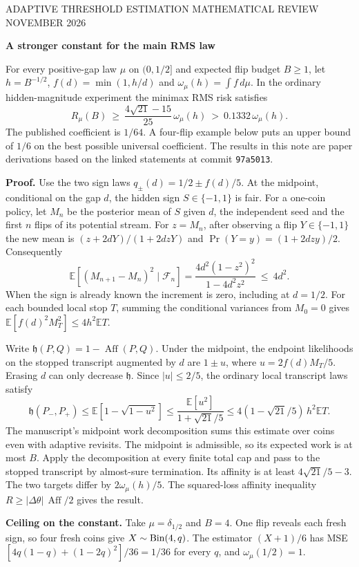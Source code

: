 \documentclass[11pt]{article}
\newcommand{\E}{\mathbb E}
\newcommand{\Aff}{\operatorname{Aff}}
\newcommand{\hd}{\mathfrak h}
\newcommand{\heading}[1]{{\LARGE\bfseries\color{ink} #1}\par\smallskip}
\begin{document}
{\small\color{ink} ADAPTIVE THRESHOLD ESTIMATION \hfill MATHEMATICAL REVIEW  NOVEMBER 2026}\par
\heading{A stronger constant for the main RMS law}
For every positive-gap law $\mu$ on $(0,1/2]$ and expected flip budget $B\ge1$, let
$h=B^{-1/2}$, $f(d)=\min(1,h/d)$ and $\omega_\mu(h)=\int f\,d\mu$.
In the ordinary hidden-magnitude experiment the minimax RMS risk satisfies
\[
   R_\mu(B)\ \ge\ \frac{4\sqrt{21}-15}{25}\,\omega_\mu(h)
          \ >\ 0.1332\,\omega_\mu(h).
\]
The published coefficient is $1/64$. A four-flip example below puts an upper bound of $1/6$ on the best possible universal coefficient. The results in this note are paper derivations based on the linked statements at commit \texttt{97a5013}.

\textbf{Proof.} Use the two sign laws $q_\pm(d)=1/2\pm f(d)/5$. At the midpoint, conditional on the gap $d$, the hidden sign $S\in\{-1,1\}$ is fair. For a one-coin policy, let $M_n$ be the posterior mean of $S$ given $d$, the independent seed and the first $n$ flips of its potential stream. For $z=M_n$, after observing a flip $Y\in\{-1,1\}$ the new mean is $(z+2dY)/(1+2dzY)$ and $\Pr(Y=y)=(1+2dzy)/2$. Consequently
\[
 \E[(M_{n+1}-M_n)^2\mid\mathcal F_n]
  =\frac{4d^2(1-z^2)^2}{1-4d^2z^2}\ \le\ 4d^2.
\]
When the sign is already known the increment is zero, including at $d=1/2$.
For each bounded local stop $T$, summing the conditional variances from $M_0=0$ gives $\E[f(d)^2 M_T^2]\le4h^2\E T$.

Write $\hd(P,Q)=1-\Aff(P,Q)$. Under the midpoint, the endpoint likelihoods on the stopped transcript augmented by $d$ are $1\pm u$, where $u=2 f(d) M_T/5$. Erasing $d$ can only decrease $\hd$. Since $|u|\le2/5$, the ordinary local transcript laws satisfy
\[
 \hd(P_-,P_+)\le \E[1-\sqrt{1-u^2}]
 \le \frac{\E[u^2]}{1+\sqrt{21}/5}
 \le 4(1-\sqrt{21}/5)\,h^2 \E T.
\]
The manuscript's midpoint work decomposition sums this estimate over coins even with adaptive revisits. The midpoint is admissible, so its expected work is at most $B$. Apply the decomposition at every finite total cap and pass to the stopped transcript by almost-sure termination. Its affinity is at least $4\sqrt{21}/5-3$. The two targets differ by $2\omega_\mu(h)/5$. The squared-loss affinity inequality $R\ge|\Delta\theta|\,\Aff/2$ gives the result.

\textbf{Ceiling on the constant.} Take $\mu=\delta_{1/2}$ and $B=4$. One flip reveals each fresh sign, so four fresh coins give $X\sim{\rm Bin}(4,q)$. The estimator $(X+1)/6$ has MSE $[4q(1-q)+(1-2q)^2]/36=1/36$ for every $q$, and $\omega_\mu(1/2)=1$.
\end{document}
